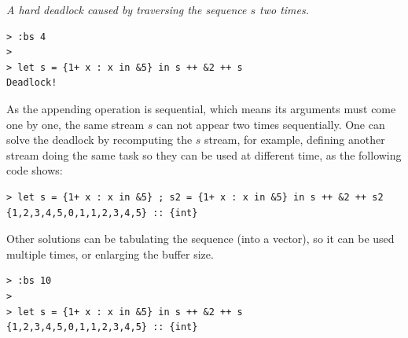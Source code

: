 \begin{itemize}
\begin{example} \emph{A hard deadlock caused by traversing the sequence $s$ two times.} \label{eg:deadlock1}
\end{example}
\begin{lstlisting}[style=nesl-style]
> :bs 4
>
> let s = {1+ x : x in &5} in s ++ &2 ++ s
Deadlock!
\end{lstlisting}
As the appending operation is sequential, which means its arguments must come one by one, the same stream $s$ can not appear two times sequentially.
One can solve the deadlock by recomputing the $s$ stream, for example,  defining another stream doing the same task so they can be used at different time, as the following code shows:\\
\begin{lstlisting}[style=nesl-style]
> let s = {1+ x : x in &5} ; s2 = {1+ x : x in &5} in s ++ &2 ++ s2
{1,2,3,4,5,0,1,1,2,3,4,5} :: {int}
\end{lstlisting}

Other solutions can be tabulating the sequence (into a vector), so it can be used multiple times, or enlarging the buffer size. \\

\begin{lstlisting}[style=nesl-style]
> :bs 10
>
> let s = {1+ x : x in &5} in s ++ &2 ++ s
{1,2,3,4,5,0,1,1,2,3,4,5} :: {int}
\end{lstlisting}
%
% 
%
%  
%
%
%


\end{itemize}


